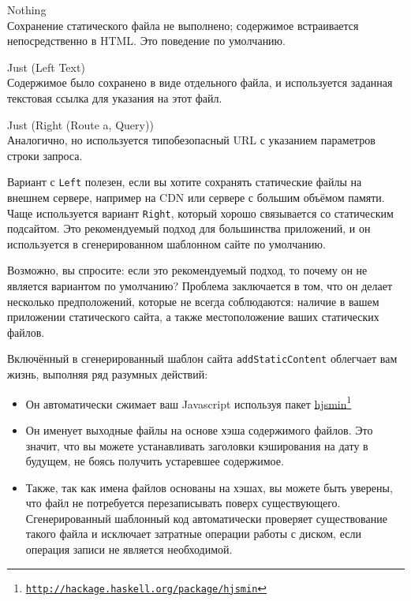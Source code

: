 \begin{description}
  \item {Nothing}  \hfill \\
    Сохранение статического файла не выполнено; содержимое встраивается
    непосредственно в HTML. Это поведение по умолчанию.

  \item {Just (Left Text)} \hfill \\
    Содержимое было сохранено в виде отдельного файла, и используется заданная
    текстовая ссылка для указания на этот файл.

  \item {Just (Right (Route a, Query))} \hfill \\
    Аналогично, но используется типобезопасный URL с указанием параметров
    строки запроса.
\end{description}

Вариант с \lstinline!Left! полезен, если вы хотите сохранять статические файлы
на внешнем сервере, например на CDN или сервере с большим объёмом памяти. Чаще
используется вариант \lstinline!Right!, который хорошо связывается со
статическим подсайтом. Это рекомендуемый подход для большинства приложений, и
он используется в сгенерированном шаблонном сайте по умолчанию.

\begin{remark}
    Возможно, вы спросите: если это рекомендуемый подход, то почему он не
    является вариантом по умолчанию? Проблема заключается в том, что он делает
    несколько предположений, которые не всегда соблюдаются: наличие в вашем
    приложении статического сайта, а также местоположение ваших статических
    файлов.
\end{remark}

Включённый в сгенерированный шаблон сайта \lstinline!addStaticContent!
облегчает вам жизнь, выполняя ряд разумных действий:
\begin{itemize}
  \item Он автоматически сжимает ваш Javascript используя пакет
      \href{http://hackage.haskell.org/package/hjsmin}{hjsmin}\footnote{\href{http://hackage.haskell.org/package/hjsmin}{\texttt{http://hackage.haskell.org/package/hjsmin}}}

  \item Он именует выходные файлы на основе хэша содержимого файлов. Это
      значит, что вы можете устанавливать заголовки кэширования на дату в
      будущем, не боясь получить устаревшее содержимое.

  \item Также, так как имена файлов основаны на хэшах, вы можете быть уверены,
      что файл не потребуется перезаписывать поверх существующего.
      Сгенерированный шаблонный код автоматически проверяет существование
      такого файла и исключает затратные операции работы с диском, если
      операция записи не является необходимой.
\end{itemize}

